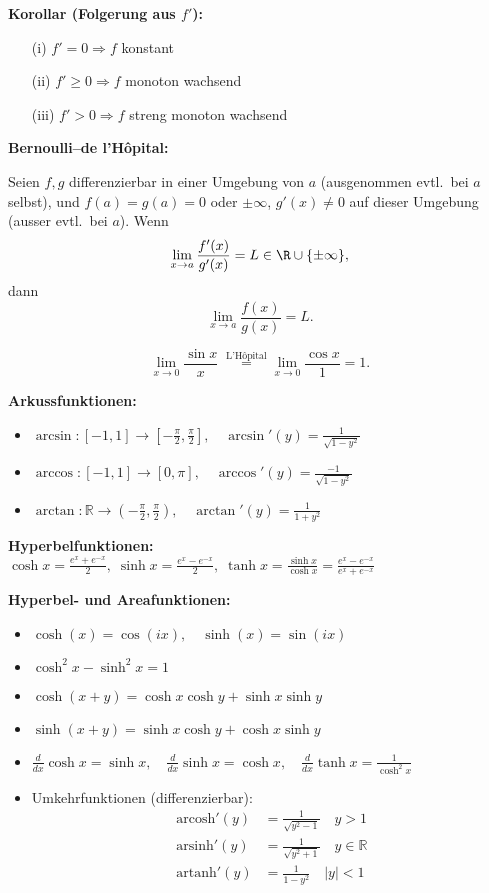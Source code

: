 \begin{itemize}
\textbf{Korollar (Folgerung aus \(f'\)):}
\begin{itemize}
  \item[(i)] \(f' = 0 \Rightarrow f\) konstant
  \item[(ii)] \(f' \ge 0 \Rightarrow f\) monoton wachsend
  \item[(iii)] \(f' > 0 \Rightarrow f\) streng monoton wachsend
\end{itemize}


\textbf{Bernoulli–de l’Hôpital:}
\begin{theorem}
  Seien $f,g$ differenzierbar in einer Umgebung von $a$ (ausgenommen evtl.\ bei $a$ selbst), und $f(a)=g(a)=0$ oder $\pm\infty$, $g'(x)\ne0$ auf dieser Umgebung (ausser evtl.\ bei $a$). Wenn
  \[
    \lim_{x\to a} \frac{f'(x)}{g'(x)} = L \in \R \cup \{\pm\infty\},
  \]
  dann
  \[
    \lim_{x\to a} \frac{f(x)}{g(x)} = L.
  \]
\end{theorem}
\begin{example}
  \[
    \lim_{x\to0} \frac{\sin x}{x} 
    \;\stackrel{\text{L'Hôpital}}= 
    \lim_{x\to0} \frac{\cos x}{1} = 1.
  \]
\end{example}

\textbf{Arkussfunktionen:}
\begin{itemize}
  \item \(\arcsin: [-1, 1] \to \left[-\tfrac{\pi}{2}, \tfrac{\pi}{2}\right], \quad \arcsin'(y) = \frac{1}{\sqrt{1 - y^2}}\)
  \item \(\arccos: [-1, 1] \to [0, \pi], \quad \arccos'(y) = \frac{-1}{\sqrt{1 - y^2}}\)
  \item \(\arctan: \mathbb{R} \to \left(-\tfrac{\pi}{2}, \tfrac{\pi}{2}\right), \quad \arctan'(y) = \frac{1}{1 + y^2}\)
\end{itemize}

\textbf{Hyperbelfunktionen:} \quad
\(\cosh x = \tfrac{e^x + e^{-x}}{2},\;
\sinh x = \tfrac{e^x - e^{-x}}{2},\;
\tanh x = \tfrac{\sinh x}{\cosh x} = \tfrac{e^x - e^{-x}}{e^x + e^{-x}}\)


\textbf{Hyperbel- und Areafunktionen:}
\begin{itemize}
  \item \(\cosh(x) = \cos(ix),\quad \sinh(x) = \sin(ix)\)
  \item \(\cosh^2 x - \sinh^2 x = 1\)
  \item \(\cosh(x+y) = \cosh x \cosh y + \sinh x \sinh y\)
  \item \(\sinh(x+y) = \sinh x \cosh y + \cosh x \sinh y\)
  \item \(\frac{d}{dx} \cosh x = \sinh x,\quad \frac{d}{dx} \sinh x = \cosh x,\quad \frac{d}{dx} \tanh x = \frac{1}{\cosh^2 x}\)
  \item Umkehrfunktionen (differenzierbar):
  \[
  \begin{aligned}
  \text{arcosh}'(y) &= \frac{1}{\sqrt{y^2 - 1}} \quad y > 1 \\
  \text{arsinh}'(y) &= \frac{1}{\sqrt{y^2 + 1}} \quad y \in \mathbb{R} \\
  \text{artanh}'(y) &= \frac{1}{1 - y^2} \quad |y| < 1
  \end{aligned}
  \]
\end{itemize}



\end{itemize}
